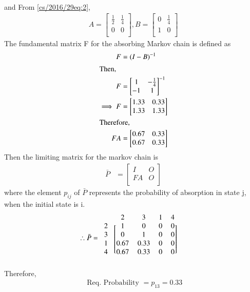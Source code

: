 \\and From \eqref{cs/2016/29eq:2},
\begin{align}
\label{cs/2016/29eq:3}
    A=\begin{bmatrix}
    \frac{1}{2} & \frac{1}{4}\\
    0 & 0\\
    \end{bmatrix},
    B=\begin{bmatrix}
    0 & \frac{1}{4} \\
    1 & 0 \\
    \end{bmatrix}
\end{align}
The fundamental matrix F for the absorbing Markov chain is defined as 
\begin{align}
    F &=(I-B)^{-1} \label{cs/2016/29eq:4}\\
\shortintertext{Then,  }
    F &= \begin{bmatrix}
    1 & -\frac{1}{4} \\
    -1 & 1 \\ 
    \end{bmatrix}^{-1} \\
    \implies F &= \begin{bmatrix}
               1.33 & 0.33 \\
               1.33 & 1.33 \\ 
               \end{bmatrix}\\
\shortintertext{Therefore,}
    FA &= \begin{bmatrix}
    0.67 & 0.33 \\
    0.67 & 0.33 \\ 
    \end{bmatrix}
    \end{align}
Then the limiting matrix for the markov chain is 
\begin{align}
\label{cs/2016/29eq:5}
    \bar P&=\begin{bmatrix}
    I & O\\
    FA & O\\
    \end{bmatrix}
\end{align}
where the element $p_{ij}$ of $\bar P$ represents the probability of absorption in state j, when the initial state is i.
\begin{align}
  \therefore \bar P&=\begin{blockarray}{ccccc}
                  & 2 & 3 & 1 & 4 \\
                  \begin{block}{c[cccc]}
                  2 & 1 & 0 & 0 & 0  \\
                  3 & 0 & 1 & 0 & 0 \\ 
                  1 & 0.67 & 0.33 & 0 & 0 \\
                  4 & 0.67 & 0.33 & 0 & 0 \\
                \end{block}
                \end{blockarray}  
\end{align}
Therefore,
\begin{align}
    \text{ Req. Probability }= p_{13} = 0.33
\end{align}